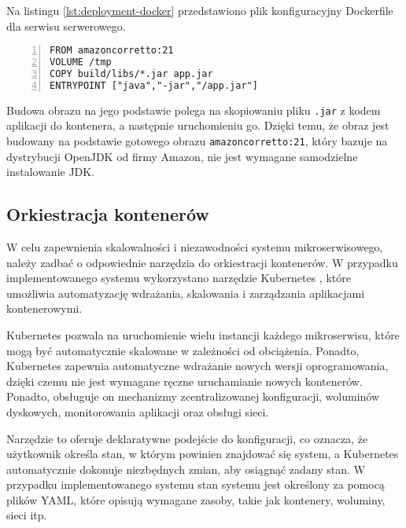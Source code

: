 Na listingu \ref{lst:deployment-docker} przedstawiono plik konfiguracyjny Dockerfile dla serwisu serwerowego.

\begin{lstlisting}[caption={Instrukcja budowania obrazu Docker serwisu serwerowego},label={lst:deployment-docker},captionpos=b,numbers=left]
FROM amazoncorretto:21
VOLUME /tmp
COPY build/libs/*.jar app.jar
ENTRYPOINT ["java","-jar","/app.jar"]
\end{lstlisting}

Budowa obrazu na jego podstawie polega na skopiowaniu pliku \texttt{.jar} z kodem aplikacji do kontenera, a następnie uruchomieniu go. Dzięki temu, że obraz jest budowany na podstawie gotowego obrazu \texttt{amazoncorretto:21}, który bazuje na dystrybucji OpenJDK od firmy Amazon, nie jest wymagane samodzielne instalowanie JDK.
    
\subsection{Orkiestracja kontenerów}

W celu zapewnienia skalowalności i niezawodności systemu mikroserwisowego, należy zadbać o odpowiednie narzędzia do orkiestracji kontenerów. W przypadku implementowanego systemu wykorzystano narzędzie Kubernetes \cite{k8s}, które umożliwia automatyzację wdrażania, skalowania i zarządzania aplikacjami kontenerowymi.

Kubernetes pozwala na uruchomienie wielu instancji każdego mikroserwisu, które mogą być automatycznie skalowane w zależności od obciążenia. Ponadto, Kubernetes zapewnia automatyczne wdrażanie nowych wersji oprogramowania, dzięki czemu nie jest wymagane ręczne uruchamianie nowych kontenerów. Ponadto, obsługuje on mechanizmy zcentralizowanej konfiguracji, woluminów dyskowych, monitorowania aplikacji oraz obsługi sieci.

Narzędzie to oferuje deklaratywne podejście do konfiguracji, co oznacza, że użytkownik określa stan, w którym powinien znajdować się system, a Kubernetes automatycznie dokonuje niezbędnych zmian, aby osiągnąć zadany stan. W przypadku implementowanego systemu stan systemu jest określony za pomocą plików YAML, które opisują wymagane zasoby, takie jak kontenery, woluminy, sieci itp.


